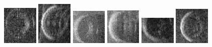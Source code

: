 \begin{figure}
    \includegraphics[width=0.15\textwidth]{chapters/images/dataset/all-class-images/tire/tire-197.jpg}
    \includegraphics[width=0.15\textwidth]{chapters/images/dataset/all-class-images/tire/tire-106.jpg}
    \includegraphics[width=0.15\textwidth]{chapters/images/dataset/all-class-images/tire/tire-13.jpg}
    \includegraphics[width=0.15\textwidth]{chapters/images/dataset/all-class-images/tire/tire-31.jpg}
    \includegraphics[width=0.15\textwidth]{chapters/images/dataset/all-class-images/tire/tire-34.jpg}
    \includegraphics[width=0.15\textwidth]{chapters/images/dataset/all-class-images/tire/tire-66.jpg}
    

\end{figure}
